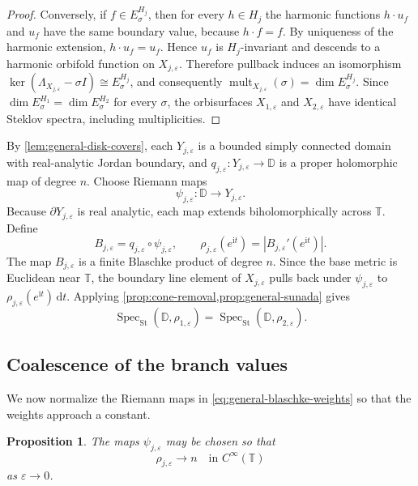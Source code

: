 \documentclass[11pt,letterpaper,reqno]{amsart}
\newtheorem{proposition}[proposition]{Proposition}
\theoremstyle{definition}
\newcommand{\D}{\mathbb D}
\newcommand{\T}{\mathbb T}
\newcommand{\SpecS}{\operatorname{Spec}_{\mathrm{St}}}
\newcommand{\dd}{\,\mathrm{d}}
\newcommand{\iu}{\mathrm{i}}
\begin{document}
\begin{proof}
Conversely, if $f\in E_\sigma^{H_j}$, then for every $h\in H_j$ the harmonic functions $h\cdot u_f$ and $u_f$ have the same boundary value, because $h\cdot f=f$. By uniqueness of the harmonic extension, $h\cdot u_f=u_f$. Hence $u_f$ is $H_j$-invariant and descends to a harmonic orbifold function on $X_{j,\varepsilon}$. Therefore pullback induces an isomorphism $\ker(\Lambda_{X_{j,\varepsilon}}-\sigma I)\cong E_\sigma^{H_j}$, and consequently $\operatorname{mult}_{X_{j,\varepsilon}}(\sigma)=\dim E_\sigma^{H_j}$. Since $\dim E_\sigma^{H_1}=\dim E_\sigma^{H_2}$ for every $\sigma$, the orbisurfaces $X_{1,\varepsilon}$ and $X_{2,\varepsilon}$ have identical Steklov spectra, including multiplicities.
\end{proof}





By \cref{lem:general-disk-covers}, each $Y_{j,\varepsilon}$ is a bounded
simply connected domain with real-analytic Jordan boundary, and
$q_{j,\varepsilon}:Y_{j,\varepsilon}\to\D$ is a proper holomorphic map
of degree $n$.
Choose Riemann maps
\[
\psi_{j,\varepsilon}:\D\longrightarrow Y_{j,\varepsilon}.
\]
Because $\partial Y_{j,\varepsilon}$ is real analytic, each map
extends biholomorphically across $\T$.  Define
\begin{equation}
B_{j,\varepsilon}
=q_{j,\varepsilon}\circ\psi_{j,\varepsilon},
\qquad
\rho_{j,\varepsilon}(e^{\iu t})
=|B_{j,\varepsilon}'(e^{\iu t})|.
\label{eq:general-blaschke-weights}
\end{equation}
The map $B_{j,\varepsilon}$ is a finite Blaschke product of degree
$n$.  Since the base metric is Euclidean near $\T$, the boundary line
element of $X_{j,\varepsilon}$ pulls back under
$\psi_{j,\varepsilon}$ to
$\rho_{j,\varepsilon}(e^{\iu t})\dd t$.  Applying
\cref{prop:cone-removal,prop:general-sunada} gives
\begin{equation}
\SpecS(\D,\rho_{1,\varepsilon})
=
\SpecS(\D,\rho_{2,\varepsilon}).
\label{eq:general-weighted-isospectrality}
\end{equation}

\subsection{Coalescence of the branch values}

We now normalize the Riemann maps in
\cref{eq:general-blaschke-weights} so that the weights approach a
constant.

\begin{proposition}
\label{prop:general-coalescence}
The maps $\psi_{j,\varepsilon}$ may be chosen so that
\begin{equation}
\rho_{j,\varepsilon}\longrightarrow n
\quad\text{in }C^\infty(\T)
\label{eq:general-weight-convergence}
\end{equation}
as $\varepsilon\to0$.
\end{proposition}
\end{document}
